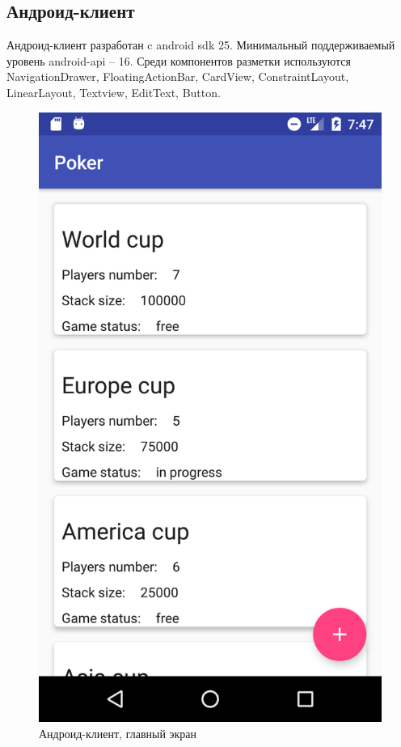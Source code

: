 \subsection*{Андроид-клиент}

Андроид-клиент разработан c android sdk 25. Минимальный поддерживаемый уровень android-api -- 16. Среди компонентов разметки используются NavigationDrawer, FloatingActionBar, CardView, ConstraintLayout, LinearLayout, Textview, EditText, Button.

\begin{figure}[H]
	\begin{center}
		\includegraphics[scale=0.15]{pics/andr1}
	    \caption{Андроид-клиент, главный экран} 
		\label{pic:andr:1}
	\end{center}
\end{figure}

